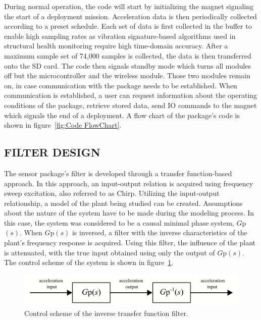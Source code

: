 \documentclass[]{spie}  %
\begin{document}
	During normal operation, the code will start by initializing the magnet signaling the start of a deployment mission. Acceleration data is then periodically collected according to a preset schedule. Each set of data is first collected in the buffer to enable high sampling rates as vibration signature-based algorithms used in structural health monitoring require high time-domain accuracy. After a maximum sample set of 74,000 samples is collected, the data is then transferred onto the SD card. The code then signals standby mode which turns all modules off but the microcontroller and the wireless module. Those two modules remain on, in case communication with the package needs to be established. When communication is established, a user can request information about the operating conditions of the package, retrieve stored data, send IO commands to the magnet which signals the end of a deployment. A flow chart of the package’s code is shown in figure~\ref{fig:Code FlowChart}.
	
	\subsection{FILTER DESIGN}


	The sensor package's filter is developed through a transfer function-based approach. In this approach, an input-output relation is acquired using frequency sweep excitation, also referred to as Chirp. Utilizing the input-output relationship, a model of the plant being studied can be created. Assumptions about the nature of the system have to be made during the modeling process. In this case, the system was considered to be a causal minimal phase system, $G$p$(s)$. When $G$p$(s)$ is inversed, a filter with the inverse characteristics of the plant’s frequency response is acquired. Using this filter, the influence of the plant is attenuated, with the true input obtained using only the output of $G$p$(s)$. The control scheme of the system is shown in figure~\ref{fig:Control_Scheme}.
	
	\begin{figure} [H]
		\centering
		\includegraphics[width=6 in]{figures/Control Scheme.png}
		\caption{Control scheme of the inverse transfer function filter.}
		\label{fig:Control_Scheme}
	\end{figure} 
\end{document}
